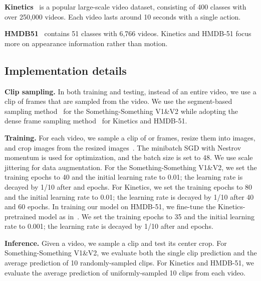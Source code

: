 \documentclass[runningheads]{llncs}
\begin{document}
\smallbreak
\noindent
\textbf{Kinetics}~\cite{kay2017kinetics} is a popular large-scale video dataset, consisting of 400 classes with over 250,000 videos. 
Each video lasts around 10 seconds with a single action.

\noindent
\textbf{HMDB51}~\cite{kuehne2011hmdb} contains 51 classes with 6,766 videos.
Kinetics and HMDB-51 focus more on appearance information rather than motion.

\subsection{Implementation details}

\textbf{Clip sampling.} In both training and testing, instead of an entire video, we use a clip of frames that are sampled from the video. 
We use the segment-based sampling method~\cite{wang2016temporal} for the Something-Something V1\&V2 while adopting the dense frame sampling method~\cite{carreira2017quo} for Kinetics and HMDB-51. 

\smallbreak
\noindent
\textbf{Training.}
For each video, we sample a clip of  or  frames, resize them into   images, and crop  images from the resized images~\cite{zolfaghari2018eco}.
The minibatch SGD with Nestrov momentum is used for optimization, and the batch size is set to 48.
We use scale jittering for data augmentation.
For the Something-Something V1\&V2, we set the training epochs to 40 and the initial learning rate to 0.01; the learning rate is decayed by 1/10 after  and  epochs.
For Kinetics, we set the training epochs to 80 and the initial learning rate to 0.01; the learning rate is decayed by 1/10 after 40 and 60 epochs. 
In training our model on HMDB-51, we fine-tune the Kinetics-pretrained model as in~\cite{tran2018closer,lin2019tsm}.
We set the training epochs to 35 and the initial learning rate to 0.001; the learning rate is decayed by 1/10 after  and  epochs.

\smallbreak
\noindent
\textbf{Inference.}
Given a video, we sample a clip and test its center crop.
For Something-Something V1\&V2, we evaluate both the single clip prediction and the average prediction of 10 randomly-sampled clips.
For Kinetics and HMDB-51, we evaluate the average prediction of uniformly-sampled 10 clips from each video.
\end{document}
